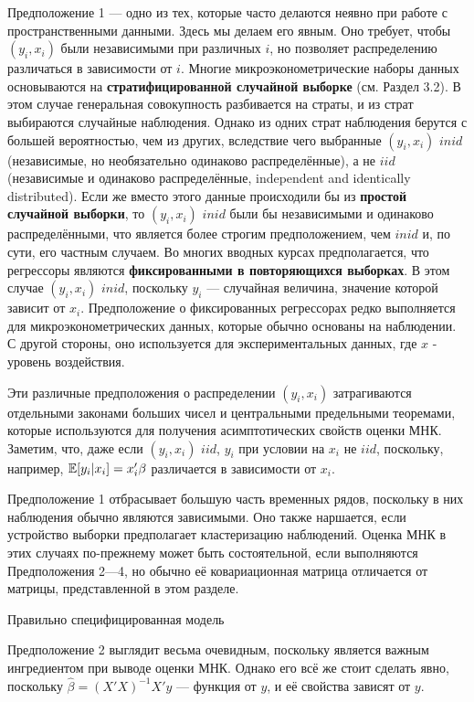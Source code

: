 Предположение 1 --- одно из тех, которые часто делаются неявно при работе с пространственными данными. Здесь мы делаем его явным. Оно требует, чтобы $(y_i, x_i)$ были независимыми при различных $i$, но позволяет распределению различаться в зависимости от $i$. Многие микроэконометрические наборы данных основываются на \textbf{стратифицированной случайной выборке} (см. Раздел 3.2). В этом случае генеральная совокупность разбивается на страты, и из страт выбираются случайные наблюдения. Однако из одних страт наблюдения берутся с большей вероятностью, чем из других, вследствие чего выбранные $(y_i, x_i)$ $inid$ (независимые, но необязательно одинаково распределённые), а не $iid$ (независимые и одинаково распределённые, independent and identically distributed). Если же вместо этого данные происходили бы из \textbf{простой случайной выборки}, то $(y_i, x_i)$ $inid$ были бы независимыми и одинаково распределёнными, что является более строгим предположением, чем $inid$ и, по сути, его частным случаем. Во многих вводных курсах предполагается, что регрессоры являются \textbf{фиксированными в повторяющихся выборках}. В этом случае  $(y_i, x_i)$ $inid$, поскольку $y_i$ --- случайная величина, значение которой зависит от $x_i$. Предположение о фиксированных регрессорах редко выполняется для микроэконометрических данных, которые обычно основаны на наблюдении. С другой стороны, оно используется для экспериментальных данных, где $x$ - уровень воздействия.

Эти различные предположения о распределении $(y_i, x_i)$ затрагиваются отдельными законами больших чисел и центральными предельными теоремами, которые используются для получения асимптотических свойств оценки МНК. Заметим, что, даже если $(y_i, x_i)$ $iid$, $y_i$ при условии на $x_i$ не $iid$, поскольку, например, $\mathbb{E}[y_i|x_i] = x_i'\beta$ различается в зависимости от $x_i$.

Предположение 1 отбрасывает большую часть временных рядов, поскольку в них наблюдения обычно являются зависимыми. Оно также наршается, если устройство выборки предполагает кластеризацию наблюдений. Оценка МНК в этих случаях по-прежнему может быть состоятельной, если выполняются Предположения 2---4, но обычно её ковариационная матрица отличается от матрицы, представленной в этом разделе.

\begin{center}
Правильно специфицированная модель
\end{center}

Предположение 2 выглядит весьма очевидным, поскольку является важным ингредиентом при выводе оценки МНК. Однако его всё же стоит сделать явно, поскольку $\hat{\beta} = (X'X)^{-1} X'y$ --- функция от $y$, и её свойства зависят от $y$.

